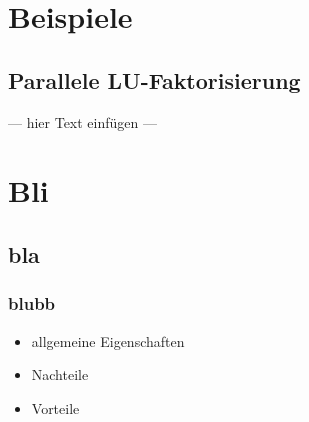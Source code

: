\documentclass[a4paper, 12pt]{article}
\begin{document}
\section{Beispiele}


\subsection{Parallele LU-Faktorisierung}
--- hier Text einfügen ---









\section{Bli}


\subsection{bla}

\subsubsection*{blubb}

\begin{itemize}
  \item allgemeine Eigenschaften
\end{itemize}
\begin{itemize}
  \renewcommand{\labelitemi}{\(-\)}%
  \item Nachteile
\end{itemize}
\begin{itemize}
  \renewcommand{\labelitemi}{+}%
  \item Vorteile
\end{itemize}
\end{document}

